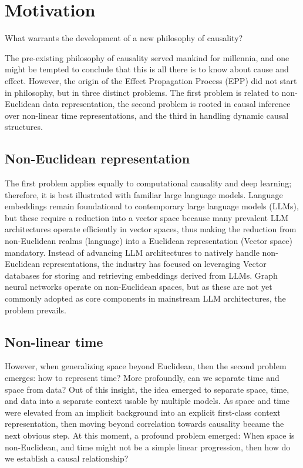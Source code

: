 \documentclass{article}
\begin{document}


\newpage

\section{Motivation}
\label{sec:motivation}


What warrants the development of a new philosophy of causality?

The pre-existing philosophy of causality served mankind for millennia, and one might be tempted to conclude that this is all there is to know about cause and effect. However, the origin of the Effect Propagation Process (EPP) did not start in philosophy, but in three distinct problems. The first problem is related to non-Euclidean data representation, the second problem is rooted in causal inference over non-linear time representations, and the third in handling dynamic causal structures.

\subsection{Non-Euclidean representation}

The first problem applies equally to computational causality and deep learning; therefore, it is best illustrated with familiar  large language models. Language embeddings remain foundational to contemporary large language models (LLMs), but these require a reduction into a vector space because many prevalent LLM architectures operate efficiently in vector spaces, thus making the reduction from non-Euclidean realms (language) into a Euclidean representation (Vector space) mandatory. Instead of advancing LLM architectures to natively handle non-Euclidean representations, the industry has focused on leveraging Vector databases for storing and retrieving embeddings derived from LLMs. Graph neural networks operate on non-Euclidean spaces, but as these are not yet commonly adopted as core components in mainstream LLM architectures, the problem prevails.

\subsection{Non-linear time}

However, when generalizing space beyond Euclidean, then the second problem emerges: how to represent time? More profoundly, can we separate time and space from data? Out of this insight, the idea emerged to separate space, time, and data into a separate context usable by multiple models. As space and time were elevated from an implicit background into an explicit first-class context representation, then moving beyond correlation towards causality became the next obvious step. At this moment, a profound problem emerged: When space is non-Euclidean, and time might not be a simple linear progression, then how do we establish a causal relationship?
\end{document}

